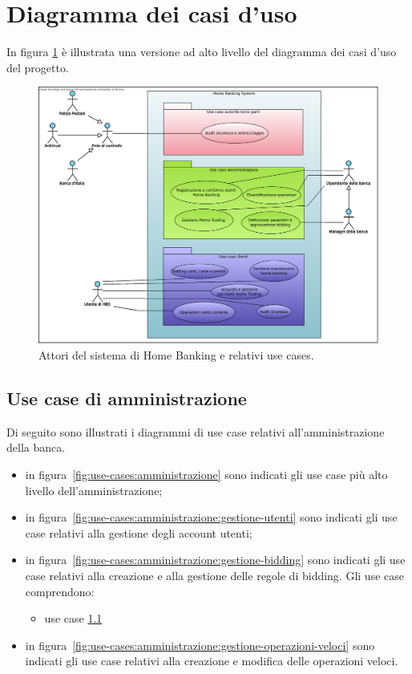 \section{Diagramma dei casi d'uso}

In figura \ref{fig:use-cases} \`e illustrata una versione ad alto livello del diagramma dei casi d'uso del progetto.

\begin{figure}
	\centering
	\includegraphics[width=\textwidth]{Images/Home_Banking_inception_use_cases.eps}
	\caption{Attori del sistema di Home Banking e relativi use cases.}
	\label{fig:use-cases}
\end{figure}

\subsection{Use case di amministrazione}

Di seguito sono illustrati i diagrammi di use case relativi all'amministrazione della banca.

\begin{itemize}
	\item in figura~\ref{fig:use-cases:amministrazione} sono indicati gli use case più alto livello dell'amministrazione;

	\item in figura~\ref{fig:use-cases:amministrazione:gestione-utenti} sono indicati gli use case relativi alla gestione degli account utenti;

	\item in figura~\ref{fig:use-cases:amministrazione:gestione-bidding} sono indicati gli use case relativi alla creazione e alla gestione delle regole di bidding.
	Gli use case comprendono:
	\begin{itemize}
		\item use case \ref{}
	\end{itemize}

	\item in figura~\ref{fig:use-cases:amministrazione:gestione-operazioni-veloci} sono indicati gli use case relativi alla creazione e modifica delle operazioni veloci.
\end{itemize}

